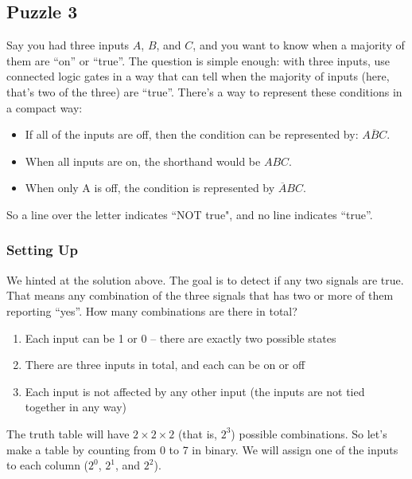 \clearpage

\subsection*{Puzzle 3}

Say you had three inputs $A$, $B$, and $C$, and you want to know when a majority of them are ``on'' or ``true''. The question is simple enough: with three inputs, use connected logic gates in a way that can tell when the majority of inputs (here, that's two of the three) are ``true''. There's a way to represent these conditions in a compact way: 
\begin{itemize}
\item If all of the inputs are off, then the condition can be represented by: $\overline{ABC}$. 
\item When all inputs are on, the shorthand would be $ABC$. 
\item When only A is off, the condition is represented by $\overline{A}BC$. 
\end{itemize}

So a line over the letter indicates ``NOT true", and no line indicates ``true''.

\subsubsection*{Setting Up}

We hinted at the solution above.
The goal is to detect if any two signals are true. 
That means any combination of the three signals that has two or more of them reporting ``yes''. 
How many combinations are there in total?

\begin{enumerate}
\item Each input can be 1 or 0 -- there are exactly two possible states
\item There are three inputs in total, and each can be on or off
\item Each input is not affected by any other input (the inputs are not tied together in any way)
\end{enumerate}

The truth table will have $2 \times 2 \times 2$ (that is, $2^3$) possible combinations. So let's make a table by counting from 0 to 7 in binary. We will assign one of the inputs to each column ($2^0$, $2^1$, and $2^2$).

\renewcommand{\arraystretch}{1.2}

